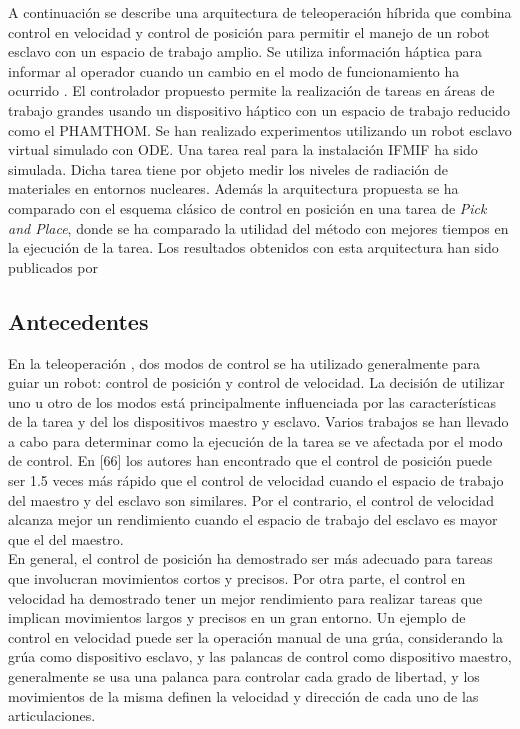 A continuación se describe una arquitectura de teleoperación híbrida que combina control en velocidad y control de posición para permitir el manejo de un robot esclavo con un espacio de trabajo amplio. Se utiliza información háptica para informar al operador cuando un cambio en el modo de  funcionamiento ha ocurrido . El controlador propuesto permite la realización de  tareas en áreas de trabajo grandes usando un dispositivo háptico con un espacio de trabajo reducido como el PHAMTHOM. Se han realizado experimentos utilizando un robot esclavo virtual simulado con ODE. Una tarea real para la instalación IFMIF ha sido simulada. Dicha tarea tiene por objeto medir los niveles de radiación de materiales en entornos nucleares. Además la arquitectura propuesta se ha comparado con el esquema clásico de control en posición en una tarea de \textit{Pick and Place}, donde se ha comparado la utilidad del método con mejores tiempos en la ejecución de la tarea. Los resultados obtenidos con esta arquitectura han sido publicados por 

\subsection*{Antecedentes}
En la teleoperación , dos modos de control se ha utilizado generalmente para guiar un robot: control de posición y control de velocidad. La decisión de utilizar uno u otro de los modos está principalmente influenciada por las características de la tarea y del los dispositivos maestro y esclavo. Varios trabajos se han llevado a cabo para determinar como la ejecución de la tarea se ve afectada por el modo de control. En [66] los autores han encontrado que el control de posición puede ser 1.5 veces más rápido que el control de velocidad cuando el espacio de trabajo del maestro y del esclavo son similares. Por el contrario, el control de velocidad alcanza mejor un rendimiento cuando el espacio de trabajo del esclavo es mayor que el del maestro.\\
En general, el control de posición ha demostrado ser más adecuado para tareas que involucran movimientos cortos y precisos. Por otra parte, el control en velocidad ha demostrado tener un mejor rendimiento para realizar tareas  que implican movimientos largos y precisos en un gran entorno. Un ejemplo de control en velocidad puede ser la operación manual de una grúa, considerando la grúa como dispositivo esclavo, y las palancas de control como dispositivo maestro, generalmente se usa una palanca para controlar cada grado de libertad, y los movimientos de la misma definen la velocidad y dirección de cada uno de las articulaciones.\\

